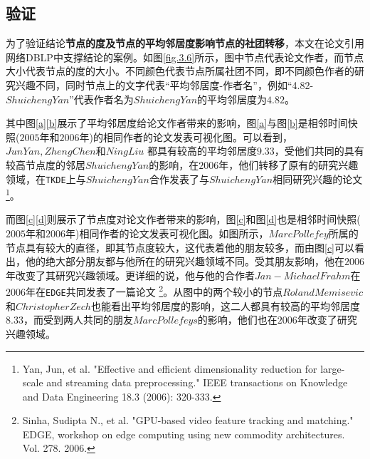 \subsection{验证}

为了验证结论\textbf{节点的度及节点的平均邻居度影响节点的社团转移}，本文在论文引用网络DBLP中支撑结论的案例。如图\ref{fig.3.6}所示，图中节点代表论文作者，而节点大小代表节点的度的大小。不同颜色代表节点所属社团不同，即不同颜色作者的研究兴趣不同，同时节点上的文字代表“平均邻居度-作者名”，例如“4.82-$Shuicheng Yan$”代表作者名为$Shuicheng Yan$的平均邻居度为$4.82$。

其中图\ref{a}\ref{b}展示了平均邻居度给论文作者带来的影响，图\ref{a}与图\ref{b}是相邻时间快照($2005$年和$2006$年)的相同作者的论文发表可视化图。可以看到，$Jun Yan,Zheng Chen$和$Ning Liu$ 都具有较高的平均邻居度$9.33$，受他们共同的具有较高节点度的邻居$Shuicheng Yan$的影响，在$2006$年，他们转移了原有的研究兴趣领域，在\texttt{TKDE}上与$Shuicheng Yan$合作发表了与$Shuicheng Yan$相同研究兴趣的论文\footnote{Yan, Jun, et al. "Effective and efficient dimensionality reduction for large-scale and streaming data preprocessing." IEEE transactions on Knowledge and Data Engineering 18.3 (2006): 320-333.}。

而图\ref{c}\ref{d}则展示了节点度对论文作者带来的影响，图\ref{c}和图\ref{d}也是相邻时间快照($2005$年和$2006$年)相同作者的论文发表可视化图。如图所示，$Marc Pollefey$所属的节点具有较大的直径，即其节点度较大，这代表着他的朋友较多，而由图\ref{c}可以看出，他的绝大部分朋友都与他所在的研究兴趣领域不同。受其朋友影响，他在$2006$年改变了其研究兴趣领域。更详细的说，他与他的合作者$Jan-Michael Frahm$在$2006$年在\texttt{EDGE}共同发表了一篇论文 \footnote{Sinha, Sudipta N., et al. "GPU-based video feature tracking and matching." EDGE, workshop on edge computing using new commodity architectures. Vol. 278. 2006.}。从图中的两个较小的节点$Roland Memisevic$和$Christopher Zech$也能看出平均邻居度的影响，这二人都具有较高的平均邻居度$8.33$，而受到两人共同的朋友$Marc Pollefeys$的影响，他们也在$2006$年改变了研究兴趣领域。

